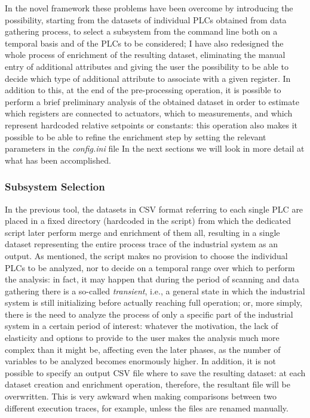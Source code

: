 \bigskip
In the novel framework these problems have been overcome by introducing the possibility, starting from the datasets of individual PLCs obtained from data gathering process, to select a subsystem from the command line both on a temporal basis and of the PLCs to be considered; I have also redesigned the whole process of enrichment of the resulting dataset, eliminating the manual entry of additional attributes and giving the user the possibility to be able to decide which type of additional attribute to associate with a given register.
In addition to this, at the end of the pre-processing operation, it is possible to perform a brief preliminary analysis of the obtained dataset in order to estimate which registers are connected to actuators, which to measurements, and which represent hardcoded relative setpoints or constants: this operation also makes it possible to be able to refine the enrichment step by setting the relevant parameters in the \textit{config.ini} file\newline \newline 
In the next sections we will look in more detail at what has been accomplished.
\vfill

\subsubsection{Subsystem Selection}
\label{subsubsec:4_select_subsystem}

In the previous tool, the datasets in CSV format referring to each single PLC are placed in a fixed directory (hardcoded in the script) from which the dedicated script later perform merge and enrichment of them all, resulting in a single dataset representing the entire process trace of the industrial system as an output. As mentioned, the script makes no provision to choose the individual PLCs to be analyzed, nor to decide on a temporal range over which to perform the analysis: in fact, it may happen that during the period of scanning and data gathering there is a so-called \textit{transient}, i.e., a general state in which the industrial system is still initializing before actually reaching full operation; or, more simply, there is the need to analyze the process of only a specific part of the industrial system in a certain period of interest: whatever the motivation, the lack of elasticity and options to provide to the user makes the analysis much more complex than it might be, affecting even the later phases, as the number of variables to be analyzed becomes enormously higher.\newline
In addition, it is not possible to specify an output CSV file where to save the resulting dataset: at each dataset creation and enrichment operation, therefore, the resultant file will be overwritten. This is very awkward when making comparisons between two different execution traces, for example, unless the files are renamed manually.

